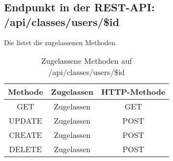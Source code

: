 \subsection{Endpunkt in der REST-API: /api/classes/users/\$id}
Die  listet die zugelassenen Methoden. 

\begin{table}[!htbp]
	\begin{tabular}{|c|c|c|}
		\hline
			\textbf{Methode} & \textbf{Zugelassen} & \textbf{HTTP-Methode} \\ \hline
			GET & Zugelassen & GET \\ \hline
			UPDATE & Zugelassen & POST \\ \hline 
			CREATE & Zugelassen & POST \\ \hline 
			DELETE & Zugelassen & POST \\ \hline
	\end{tabular}

		\caption{Zugelassene Methoden auf /api/classes/users/\$id}
		\label{tab:end:rest:api:classes:users:id:meth}
\end{table}